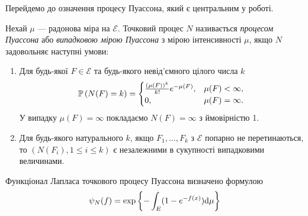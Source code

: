 Перейдемо до означення процесу Пуассона, який є центральним у роботі.
\begin{definition}\label{def:poiss_proc}
    Нехай $\mu$ --- радонова міра на $\mathcal{E}$.
    Точковий процес $N$ називається \emph{процесом Пуассона} або
    \emph{випадковою мірою Пуассона} з мірою інтенсивності $\mu$, якщо $N$ 
    задовольняє наступні умови:
    \begin{enumerate}
        \item Для будь-якої $F \in \mathcal{E}$ 
        та будь-якого невід'ємного цілого числа $k$
        \begin{gather*}
            \P{N(F) = k} = \begin{cases}
                \frac{(\mu(F))^k}{k!} e^{-\mu(F)}, & \mu(F) < \infty, \\
                0, & \mu(F) = \infty.
            \end{cases}
        \end{gather*}
        У випадку $\mu(F) = \infty$ покладаємо $N(F) = \infty$ з ймовірністю 1.
        \item Для будь-якого натурального $k$, 
        якщо $F_1, \dots, F_k$ з $\mathcal{E}$ попарно не перетинаються, то
        $\left(N(F_i), 1\leq i \leq k\right)$ є незалежними в сукупності випадковими величинами.
    \end{enumerate}
    Функціонал Лапласа точкового процесу Пуассона визначено формулою
    \begin{gather}
        \psi_N(f) = \exp\left\{ 
            - \int_E (1 - e^{-f(x)}) \d \mu
        \right\}
    \end{gather}
\end{definition}

